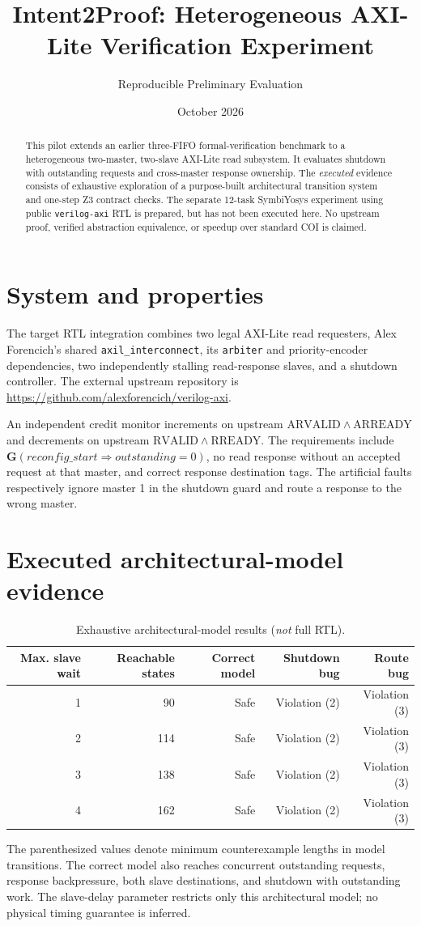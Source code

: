 \documentclass[10pt]{article}
\title{Intent2Proof: Heterogeneous AXI-Lite Verification Experiment}
\author{Reproducible Preliminary Evaluation}
\date{October 2026}
\begin{document}
\maketitle
\begin{abstract}
This pilot extends an earlier three-FIFO formal-verification benchmark to a
heterogeneous two-master, two-slave AXI-Lite read subsystem. It evaluates
shutdown with outstanding requests and cross-master response ownership. The
\emph{executed} evidence consists of exhaustive exploration of a purpose-built
architectural transition system and one-step Z3 contract checks. The separate
12-task SymbiYosys experiment using public \texttt{verilog-axi} RTL is
prepared, but has not been executed here. No upstream proof, verified
abstraction equivalence, or speedup over standard COI is claimed.
\end{abstract}
\section{System and properties}
The target RTL integration combines two legal AXI-Lite read requesters,
Alex Forencich's shared \texttt{axil\_interconnect}, its \texttt{arbiter}
and priority-encoder dependencies, two independently stalling
read-response slaves, and a shutdown controller. The external upstream
repository is \url{https://github.com/alexforencich/verilog-axi}.

An independent credit monitor increments on upstream
\(\mathrm{ARVALID}\wedge\mathrm{ARREADY}\) and decrements on upstream
\(\mathrm{RVALID}\wedge\mathrm{RREADY}\). The requirements include
\(\mathbf{G}(reconfig\_start \Rightarrow outstanding = 0)\),
no read response without an accepted request at that master, and correct
response destination tags. The artificial faults respectively ignore master 1
in the shutdown guard and route a response to the wrong master.

\section{Executed architectural-model evidence}
\begin{table}[H]\centering
\caption{Exhaustive architectural-model results (\emph{not} full RTL).}
\begin{tabular}{@{}rrrrr@{}}\toprule
Max. slave wait & Reachable states & Correct model & Shutdown bug & Route bug\\\midrule
1 & 90 & Safe & Violation (2) & Violation (3)\\
2 & 114 & Safe & Violation (2) & Violation (3)\\
3 & 138 & Safe & Violation (2) & Violation (3)\\
4 & 162 & Safe & Violation (2) & Violation (3)\\\bottomrule
\end{tabular}
\end{table}
The parenthesized values denote minimum counterexample lengths in model
transitions. The correct model also reaches concurrent outstanding requests,
response backpressure, both slave destinations, and shutdown with outstanding
work. The slave-delay parameter restricts only this architectural model; no
physical timing guarantee is inferred.
\end{document}
